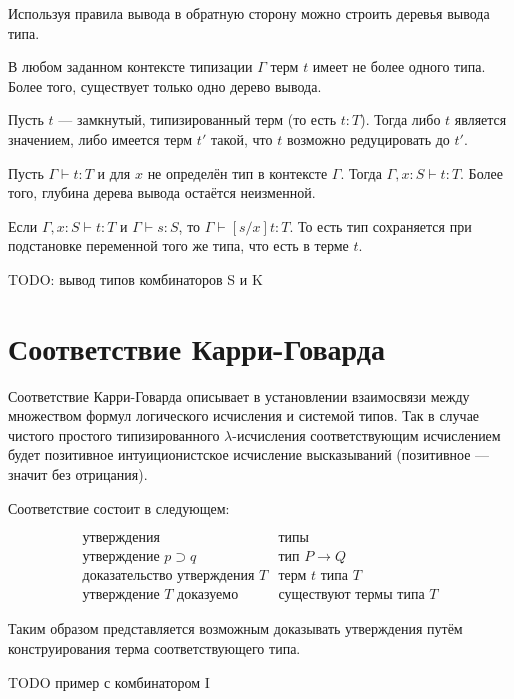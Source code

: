 Используя правила вывода в обратную сторону можно строить деревья вывода типа.

\begin{theorem}
    В любом заданном контексте типизации $\Gamma$ терм $t$ имеет не более одного типа. Более того, существует только одно дерево вывода.
\end{theorem}

\begin{theorem}
    Пусть $t$ --- замкнутый, типизированный терм (то есть $t:T$). Тогда либо $t$ является значением, либо имеется терм $t'$ такой, что $t$ возможно редуцировать до $t'$.
\end{theorem}

\begin{theorem}
    Пусть $\Gamma \vdash t:T$ и для $x$ не определён тип в контексте $\Gamma$. Тогда $\Gamma, x: S \vdash t: T$. Более того, глубина дерева вывода остаётся неизменной.
\end{theorem}

\begin{theorem}
    Если $\Gamma, x:S\vdash t: T$ и $\Gamma \vdash s: S$, то $\Gamma \vdash [s/x]t: T$. То есть тип сохраняется при подстановке переменной того же типа, что есть в терме $t$.
\end{theorem}

TODO: вывод типов комбинаторов S и K

\section{Соответствие Карри-Говарда}

Соответствие Карри-Говарда описывает в установлении взаимосвязи между множеством формул логического исчисления и системой типов. Так в случае чистого простого типизированного $\lambda$-исчисления соответствующим исчислением будет позитивное интуиционистское исчисление высказываний (позитивное --- значит без отрицания).

Соответствие состоит в следующем:

\begin{equation*}
    \begin{array}{rl}
        \text{утверждения} & \text{типы} \\
        \text{утверждение }p \supset q & \text{тип } P \to Q \\
        \text{доказательство утверждения }T & \text{терм }t \text{ типа }T \\ 
        \text{утверждение }T \text{ доказуемо} & \text{существуют термы типа }T
    \end{array}
\end{equation*}

Таким образом представляется возможным доказывать утверждения путём конструирования терма соответствующего типа.

TODO пример с комбинатором I

